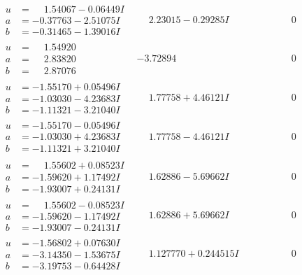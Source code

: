 \documentclass[1p]{elsarticle_modified}
\theoremstyle{definition}
\begin{document}
$$\begin{array}{c|c|c}
\begin{aligned}
u &= \phantom{-}1.54067 - 0.06449 I \\
a &= -0.37763 - 2.51075 I \\
b &= -0.31465 - 1.39016 I\end{aligned}
 & \phantom{-}2.23015 - 0.29285 I & \phantom{-0.000000 } 0 \\ \hline\begin{aligned}
u &= \phantom{-}1.54920\phantom{ +0.000000I} \\
a &= \phantom{-}2.83820\phantom{ +0.000000I} \\
b &= \phantom{-}2.87076\phantom{ +0.000000I}\end{aligned}
 & -3.72894\phantom{ +0.000000I} & \phantom{-0.000000 } 0 \\ \hline\begin{aligned}
u &= -1.55170 + 0.05496 I \\
a &= -1.03030 - 4.23683 I \\
b &= -1.11321 - 3.21040 I\end{aligned}
 & \phantom{-}1.77758 + 4.46121 I & \phantom{-0.000000 } 0 \\ \hline\begin{aligned}
u &= -1.55170 - 0.05496 I \\
a &= -1.03030 + 4.23683 I \\
b &= -1.11321 + 3.21040 I\end{aligned}
 & \phantom{-}1.77758 - 4.46121 I & \phantom{-0.000000 } 0 \\ \hline\begin{aligned}
u &= \phantom{-}1.55602 + 0.08523 I \\
a &= -1.59620 + 1.17492 I \\
b &= -1.93007 + 0.24131 I\end{aligned}
 & \phantom{-}1.62886 - 5.69662 I & \phantom{-0.000000 } 0 \\ \hline\begin{aligned}
u &= \phantom{-}1.55602 - 0.08523 I \\
a &= -1.59620 - 1.17492 I \\
b &= -1.93007 - 0.24131 I\end{aligned}
 & \phantom{-}1.62886 + 5.69662 I & \phantom{-0.000000 } 0 \\ \hline\begin{aligned}
u &= -1.56802 + 0.07630 I \\
a &= -3.14350 - 1.53675 I \\
b &= -3.19753 - 0.64428 I\end{aligned}
 & \phantom{-}1.127770 + 0.244515 I & \phantom{-0.000000 } 0\\

\end{array}$$
\end{document}
